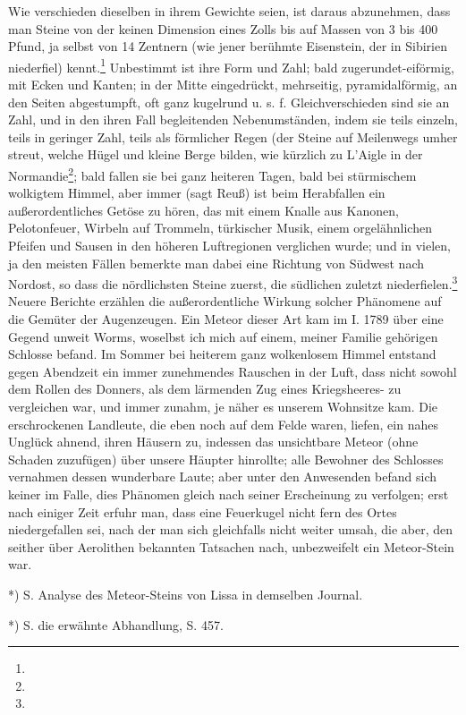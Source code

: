 \documentclass[a4paper, 11pt, oneside, polutonikogreek, german]{article}
\begin{document}
Wie verschieden dieselben in ihrem Gewichte seien, ist daraus abzunehmen, dass man Steine von der keinen Dimension eines Zolls bis auf Massen von 3 bis 400 Pfund, ja selbst von 14 Zentnern (wie jener berühmte Eisenstein, der in Sibirien niederfiel) kennt.\footnote{} Unbestimmt ist ihre Form und Zahl; bald zugerundet-eiförmig, mit Ecken und Kanten; in der Mitte eingedrückt, mehrseitig, pyramidalförmig, an den Seiten abgestumpft, oft ganz kugelrund u. s. f. Gleichverschieden sind sie an Zahl, und in den ihren Fall begleitenden Nebenumständen, indem sie teils einzeln, teils in geringer Zahl, teils als förmlicher Regen (der Steine auf Meilenwegs umher streut, welche Hügel und kleine Berge bilden, wie kürzlich zu L’Aigle in der Normandie\footnote{}; bald fallen sie bei ganz heiteren Tagen, bald bei stürmischem wolkigtem Himmel, aber immer (sagt Reuß) ist beim Herabfallen ein außerordentliches Getöse zu hören, das mit einem Knalle aus Kanonen, Pelotonfeuer, Wirbeln auf Trommeln, türkischer Musik, einem orgelähnlichen Pfeifen und Sausen in den höheren Luftregionen verglichen wurde; und in vielen, ja den meisten Fällen bemerkte man dabei eine Richtung von Südwest nach Nordost, so dass die nördlichsten Steine zuerst, die südlichen zuletzt niederfielen.\footnote{} Neuere Berichte erzählen die außerordentliche Wirkung solcher Phänomene auf die Gemüter der Augenzeugen. Ein Meteor dieser Art kam im I. 1789 über eine Gegend unweit Worms, woselbst ich mich auf einem, meiner Familie gehörigen Schlosse befand. Im Sommer bei heiterem ganz wolkenlosem Himmel entstand gegen Abendzeit ein immer zunehmendes Rauschen in der Luft, dass nicht sowohl dem Rollen des Donners, als dem lärmenden Zug eines Kriegsheeres- zu vergleichen war, und immer zunahm, je näher es unserem Wohnsitze kam. Die erschrockenen Landleute, die eben noch auf dem Felde waren, liefen, ein nahes Unglück ahnend, ihren Häusern zu, indessen das unsichtbare Meteor (ohne Schaden zuzufügen) über unsere Häupter hinrollte; alle Bewohner des Schlosses vernahmen dessen wunderbare Laute; aber unter den Anwesenden befand sich keiner im Falle, dies Phänomen gleich nach seiner Erscheinung zu verfolgen; erst nach einiger Zeit erfuhr man, dass eine Feuerkugel nicht fern des Ortes niedergefallen sei, nach der man sich gleichfalls nicht weiter umsah, die aber, den seither über Aerolithen bekannten Tatsachen nach, unbezweifelt ein Meteor-Stein war.

*) S. Analyse des Meteor-Steins von Lissa in demselben Journal.

*) S. die erwähnte Abhandlung, S. 457.
\end{document}
